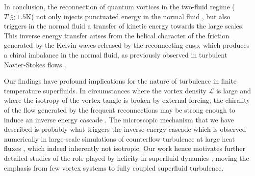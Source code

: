 \documentclass[%
 reprint,
 amsmath,amssymb,
 aps,
 prl,
]{revtex4-2}
\begin{document}
{%
In conclusion, the reconnection of quantum vortices in the two-fluid regime
($T\gtrsim 1.5$K) not only injects punctuated
energy in the normal fluid \cite{stasiak2024quantum}, but also triggers in the normal fluid
a transfer of kinetic energy towards the large scales. 
This inverse energy transfer arises from the helical character of the
friction generated by the Kelvin waves released by the reconnecting
cusp, which produces a chiral imbalance in the normal fluid, as 
previously observed in turbulent Navier-Stokes flows
\cite{biferaleInverseEnergyCascade2012a,plunianInverseCascadeEnergy2020a}.

Our findings have profound implications for the nature of turbulence in 
finite temperature superfluids. In circumstances where the vortex density 
$\mathcal{L}$ is large and where the isotropy of the vortex tangle 
is broken by external forcing, the chirality of the flow generated by the 
frequent reconnections may be strong enough to induce an inverse energy 
cascade \cite{notes_recon}.
The microscopic mechanism that we have described is probably what
triggers the inverse energy cascade which is observed numerically in  
large-scale simulations of counterflow turbulence at large heat fluxes \cite{polanco2020}, which
indeed inherently not isotropic.
Our work hence motivates further detailed studies of
the role played by helicity in superfluid dynamics 
\cite{dileoni2016,galantucci2021},
moving the emphasis from few vortex systems \cite{scheeler2014} 
to fully coupled superfluid turbulence.
 




}
\end{document}
